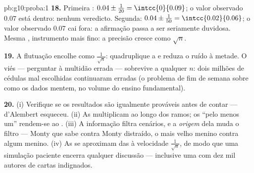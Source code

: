 \begin{solution}{pb:g10:proba:1}
\textbf{18.} Primeira : 
$0.04 \pm \frac{1}{20} = \intcc{0}{0.09}$; o valor observado
$0.07$ está dentro: nenhum veredicto. Segunda:
$0.04 \pm \frac{1}{50} = \intcc{0.02}{0.06}$; o valor observado
$0.07$ cai fora: a afirmação passa a ser seriamente duvidosa.
Mesma , instrumento mais fino: a precisão cresce como
$\sqrt n$.

\textbf{19.} A flutuação encolhe como $\frac{1}{\sqrt n}$:
quadruplique a  e reduza o ruído à metade. O viés ---
perguntar à multidão errada --- sobrevive a qualquer $n$: dois
milhões de cédulas mal escolhidas continuaram erradas (o
problema de fim de semana sobre como os dados mentem, no volume
do ensino fundamental).

\textbf{20.} (i) Verifique se os resultados são igualmente
prováveis antes de contar --- d'Alembert esqueceu. (ii) As
 multiplicam ao longo dos ramos; os ``pelo menos um''
rendem-se ao . (iii) A informação filtra cenários,
e a \emph{origem} dela muda o filtro --- Monty que sabe contra
Monty distraído, o mais velho menino contra algum menino.
(iv) As  se aproximam das  à
velocidade $\frac{1}{\sqrt n}$, de modo que uma simulação
paciente encerra qualquer discussão --- inclusive uma com dez
mil autores de cartas indignados.
\end{solution}
